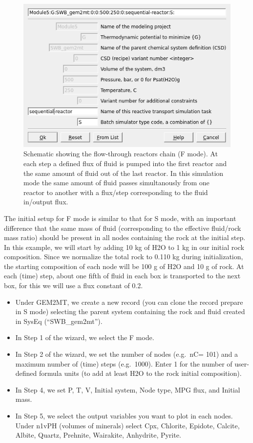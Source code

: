 \documentclass[
]{book}
\begin{document}
\begin{figure}
\includegraphics[width=0.7\linewidth]{figures/module5/fig-3} \caption{Schematic showing the flow-through reactors chain (F mode). At each step a defined flux of fluid is pumped into the first reactor and the same amount of fluid out of the last reactor. In this simulation mode the same amount of fluid passes simultanously from one reactor to another with a flux/step corresponding to the fluid in/output flux.}\label{fig:fig-3e}
\end{figure}

The initial setup for F mode is similar to that for S mode, with an important difference that the same mass of fluid (corresponding to the effective fluid/rock mass ratio) should be present in all nodes containing the rock at the initial step. In this example, we will start by adding 10 kg of H2O to 1 kg in our initial rock composition. Since we normalize the total rock to 0.110 kg during initialization, the starting composition of each node will be 100 g of H2O and 10 g of rock. At each (time) step, about one fifth of fluid in each box is transported to the next box, for this we will use a flux constant of 0.2.

\begin{itemize}
\item
  Under GEM2MT, we create a new record (you can clone the record prepare in S mode) selecting the parent system containing the rock and fluid created in SysEq (``SWB\_gem2mt'').
\item
  In Step 1 of the wizard, we select the F mode.
\item
  In Step 2 of the wizard, we set the number of nodes (e.g.~nC= 101) and a maximum number of (time) steps (e.g.~1000). Enter 1 for the number of user-defined formula units (to add at least H2O to the rock initial composition).
\item
  In Step 4, we set P, T, V, Initial system, Node type, MPG flux, and Initial mass.
\item
  In Step 5, we select the output variables you want to plot in each nodes. Under n1vPH (volumes of minerals) select Cpx, Chlorite, Epidote, Calcite, Albite, Quartz, Prehnite, Wairakite, Anhydrite, Pyrite.
\end{itemize}
\end{document}
